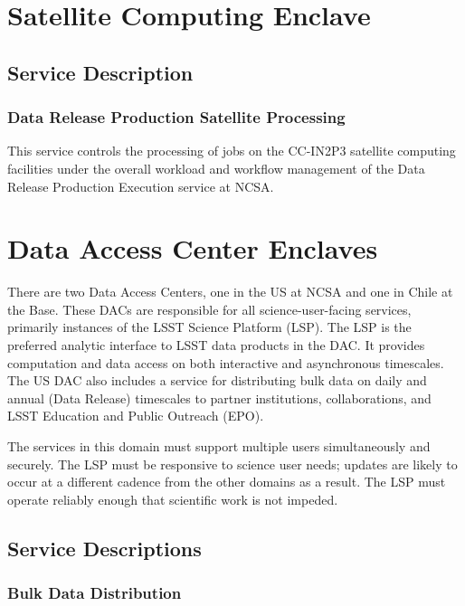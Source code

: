 \documentclass[]{article}
\begin{document}
\section{Satellite Computing Enclave}\label{satellite-computing-enclave}

\subsection{Service Description}\label{service-description}

\subsubsection{Data Release Production Satellite
Processing}\label{data-release-production-satellite-processing}

This service controls the processing of jobs on the CC-IN2P3 satellite
computing facilities under the overall workload and workflow management
of the Data Release Production Execution service at NCSA.

\section{Data Access Center Enclaves}\label{data-access-center-enclaves}

There are two Data Access Centers, one in the US at NCSA and one in
Chile at the Base. These DACs are responsible for all
science-user-facing services, primarily instances of the LSST Science
Platform (LSP). The LSP is the preferred analytic interface to LSST data
products in the DAC. It provides computation and data access on both
interactive and asynchronous timescales. The US DAC also includes a
service for distributing bulk data on daily and annual (Data Release)
timescales to partner institutions, collaborations, and LSST Education
and Public Outreach (EPO).

The services in this domain must support multiple users simultaneously
and securely. The LSP must be responsive to science user needs; updates
are likely to occur at a different cadence from the other domains as a
result. The LSP must operate reliably enough that scientific work is not
impeded.

\subsection{Service Descriptions}\label{service-descriptions-3}

\subsubsection{Bulk Data Distribution}\label{bulk-data-distribution}
\end{document}
